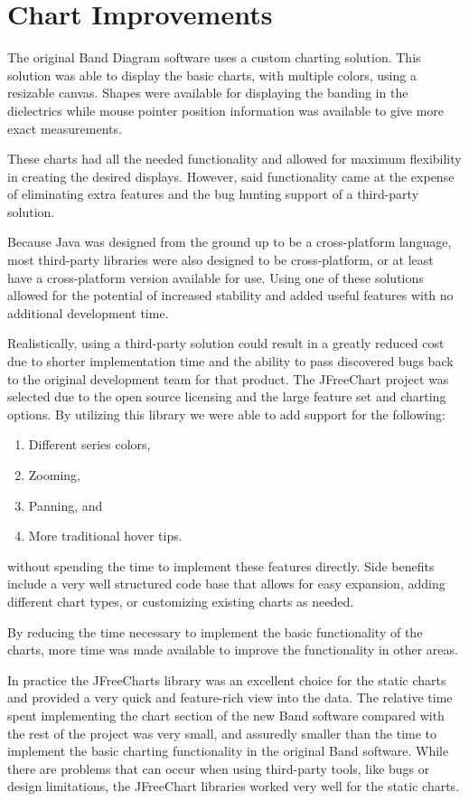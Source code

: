 \documentclass[project]{bsu-ms}
\begin{document}
\section{Chart Improvements}\label{sec:chartImprovements}
The original Band Diagram software uses a custom charting solution. This solution was able to display the basic charts, with multiple colors, using a resizable canvas. Shapes were available for displaying the banding in the dielectrics while mouse pointer position information was available to give more exact measurements. 

These charts had all the needed functionality and allowed for maximum flexibility in creating the desired displays. However, said functionality came at the expense of eliminating extra features and the bug hunting support of a third-party solution. 

Because Java was designed from the ground up to be a cross-platform language, most third-party libraries were also designed to be cross-platform, or at least have a cross-platform version available for use. Using one of these solutions allowed for the potential of increased stability and added useful features with no additional development time. 

Realistically, using a third-party solution could result in a greatly reduced cost due to shorter implementation time and the ability to pass discovered bugs back to the original development team for that product. The JFreeChart project was selected due to the open source licensing and the large feature set and charting options. By utilizing this library we were able to add support for the following: 

\begin{enumerate}
\item Different series colors, 
\item Zooming,
\item Panning, and
\item More traditional hover tips.
\end{enumerate}

without spending the time to implement these features directly. Side benefits include a very well structured code base that allows for easy expansion, adding different chart types, or customizing existing charts as needed. 

By reducing the time necessary to implement the basic functionality of the charts, more time was made available to improve the functionality in other areas.

In practice the JFreeCharts library was an excellent choice for the static charts and provided a very quick and feature-rich view into the data. The relative time spent implementing the chart section of the new Band software compared with the rest of the project was very small, and assuredly smaller than the time to implement the basic charting functionality in the original Band software. While there are problems that can occur when using third-party tools, like bugs or design limitations, the JFreeChart libraries worked very well for the static charts. 
\end{document}
